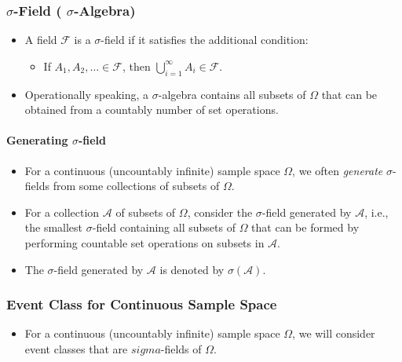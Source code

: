 \subsubsection{$\sigma$-Field ( $\sigma$-Algebra)}

\begin{itemize}
\item A field $\mathcal{F}$ is a $\sigma$-field if it satisfies the additional condition:

\begin{itemize}
\item If $A_{1}, A_{2}, \ldots \in \mathcal{F}$, then $\bigcup_{i=1}^{\infty} A_{i} \in \mathcal{F}$.
\end{itemize}


\item Operationally speaking, a $\sigma$-algebra contains all subsets of $\Omega$ that can be obtained from a countably number of set operations.
\end{itemize}

\paragraph{Generating $\sigma$-field}

\begin{itemize}
\item For a continuous (uncountably infinite) sample space $\Omega$, we often \textit{generate} $\sigma$-fields from some collections of subsets of $\Omega$.
\item For a collection $\mathcal{A}$ of subsets of $\Omega$, consider the $\sigma$-field generated by $\mathcal{A}$, i.e., the smallest $\sigma$-field containing all subsets of $\Omega$ that can be formed by performing countable set operations on subsets in $\mathcal{A}$.
\item The $\sigma$-field generated by $\mathcal{A}$ is denoted by $\sigma(\mathcal{A})$.
\end{itemize}

\subsubsection{Event Class for Continuous Sample Space}

\begin{itemize}
\item For a continuous (uncountably infinite) sample space $\Omega$, we will consider event classes that are $sigma$-fields of $\Omega$.
\end{itemize}

